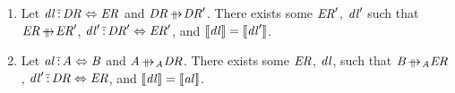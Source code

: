 \documentclass[numbers,10pt,preprint\ifanon ,nocopyrightspace\fi]{sigplanconf}
\begin{document}
\begin{lemma}
  \label{lem:copyable_expansions_left_swapless}\leavevmode
  \begin{enumerate}
  \item Let $\mathit{dl} \,\tilde{:}\, \mathit{DR} \Leftrightarrow
    \mathit{ER}$ and $\DNFRegex \ParallelRewrite \DNFRegex'$.  There exists some
    $\mathit{ER}'$, $\mathit{dl}'$ such that $\DNFRegexAlt \ParallelRewrite
    \DNFRegexAlt'$,
    $\mathit{dl}' \,\tilde{:}\,
    \mathit{DR}' \Leftrightarrow \mathit{ER}'$, and $[ \! [\mathit{dl}] \! ] =
    [ \! [\mathit{dl}'] \! ]$.
  \item Let $\mathit{al} \,\tilde{:}\, \mathit{A} \Leftrightarrow \mathit{B}$ and
    $\Atom \ParallelRewriteAtom \DNFRegex$.  There exists some $\mathit{ER}$,
    $\mathit{dl}$, such that $\AtomAlt \ParallelRewriteAtom \DNFRegexAlt$,
    $\mathit{dl}' \,\tilde{:}\, \mathit{DR}
    \Leftrightarrow \mathit{ER}$, and $[ \! [\mathit{dl}] \! ] =
    [ \! [\mathit{al}] \! ]$.
  \end{enumerate}
\end{lemma}
\end{document}
